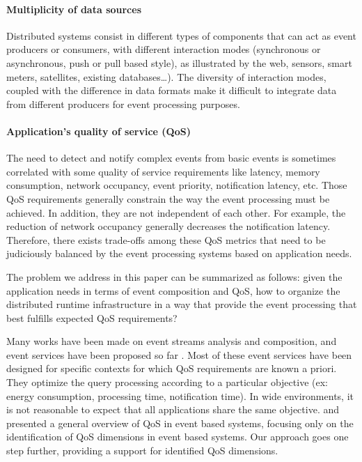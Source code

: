 \documentclass[a4paper,twoside]{article}
\begin{document}
\paragraph{Multiplicity of data sources}
Distributed systems consist in different types of components that can act as event producers or consumers, with different interaction modes (synchronous or asynchronous, push or pull based style), as illustrated by the web, sensors, smart meters, satellites, existing databases…). The diversity of interaction modes, coupled with the difference in data formats make it difficult to integrate data from different producers for event processing purposes.
\paragraph{Application’s quality of service (QoS)}
The need to detect and notify complex events from basic events is sometimes correlated with some quality of service requirements like latency, memory consumption, network occupancy, event priority, notification latency, etc. Those QoS requirements generally constrain the way the event processing must be achieved. In addition, they are not independent of each other. For example, the reduction of network occupancy generally decreases the notification latency. Therefore, there exists trade-offs among these QoS metrics that need to be judiciously balanced by the event processing systems based on application needs.

The problem we address in this paper can be summarized as follows: given the application needs in terms of event composition and QoS, how to organize the distributed runtime infrastructure in a way that provide the event processing that best fulfills expected QoS requirements?

Many works have been made on event streams analysis and composition, and event services have been proposed so far \cite{Esper,Streambase,Cugola2009,Gyllstrom2006,Oracle}. Most of these event services have been designed for specific contexts for which QoS requirements are known a priori. They optimize the query processing according to a particular objective (ex: energy consumption, processing time, notification time). In wide environments, it is not reasonable to expect that all applications share the same objective. \cite{Behnel2006} and \cite{Appel2010} presented a general overview of QoS in event based systems, focusing only on the identification of QoS dimensions in event based systems. Our approach goes one step further, providing a support for identified QoS dimensions.
\end{document}
